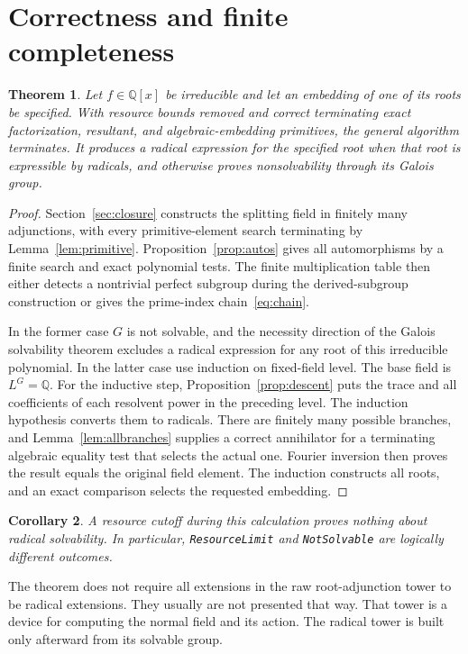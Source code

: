 \documentclass[11pt]{article}
\newtheorem{theorem}{Theorem}[section]
\newtheorem{corollary}[theorem]{Corollary}
\theoremstyle{definition}\newtheorem{definition}[theorem]{Definition}
\theoremstyle{remark}\newtheorem{remark}[theorem]{Remark}
\newcommand{\Q}{\mathbb Q}\newcommand{\C}{\mathbb C}\newcommand{\Z}{\mathbb Z}
\newcommand{\code}[1]{\texttt{#1}}
\begin{document}
\section{Correctness and finite completeness}\label{sec:complete}

\begin{theorem}\label{thm:complete}
Let $f\in\Q[x]$ be irreducible and let an embedding of one of its roots be
specified. With resource bounds removed and correct terminating exact
factorization, resultant, and algebraic-embedding primitives, the general
algorithm terminates. It produces a radical expression for the specified root
when that root is expressible by radicals, and otherwise proves
nonsolvability through its Galois group.
\end{theorem}
\begin{proof}
Section~\ref{sec:closure} constructs the splitting field in finitely many
adjunctions, with every primitive-element search terminating by
Lemma~\ref{lem:primitive}. Proposition~\ref{prop:autos} gives all automorphisms
by a finite search and exact polynomial tests. The finite multiplication table
then either detects a nontrivial perfect subgroup during the derived-subgroup
construction or gives the prime-index chain~\eqref{eq:chain}.

In the former case $G$ is not solvable, and the necessity direction of the
Galois solvability theorem excludes a radical expression for any root of this
irreducible polynomial. In the latter case use induction on fixed-field level.
The base field is $L^G=\Q$. For the inductive step,
Proposition~\ref{prop:descent} puts the trace and all coefficients of each
resolvent power in the preceding level. The induction hypothesis converts
them to radicals. There are finitely many possible branches, and
Lemma~\ref{lem:allbranches} supplies a correct annihilator for a terminating
algebraic equality test that selects the actual one. Fourier inversion then
proves the result equals the original field element. The induction constructs
all roots, and an exact comparison selects the requested embedding.
\end{proof}

\begin{corollary}
A resource cutoff during this calculation proves nothing about radical
solvability. In particular, \code{ResourceLimit} and \code{NotSolvable} are
logically different outcomes.
\end{corollary}

The theorem does not require all extensions in the raw root-adjunction tower
to be radical extensions. They usually are not presented that way. That tower
is a device for computing the normal field and its action. The radical tower
is built only afterward from its solvable group.
\end{document}
